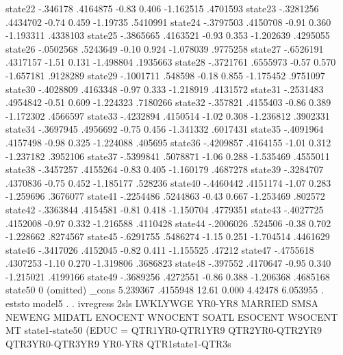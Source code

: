      state22 {\VBAR}   -.346178   .4164875    -0.83   0.406    -1.162515    .4701593
     state23 {\VBAR}  -.3281256   .4434702    -0.74   0.459     -1.19735    .5410991
     state24 {\VBAR}  -.3797503   .4150708    -0.91   0.360    -1.193311    .4338103
     state25 {\VBAR}  -.3865665   .4163521    -0.93   0.353    -1.202639    .4295055
     state26 {\VBAR}  -.0502568   .5243649    -0.10   0.924    -1.078039    .9775258
     state27 {\VBAR}  -.6526191   .4317157    -1.51   0.131    -1.498804    .1935663
     state28 {\VBAR}  -.3721761   .6555973    -0.57   0.570    -1.657181    .9128289
     state29 {\VBAR}  -.1001711    .548598    -0.18   0.855    -1.175452    .9751097
     state30 {\VBAR}  -.4028809   .4163348    -0.97   0.333    -1.218919    .4131572
     state31 {\VBAR}  -.2531483   .4954842    -0.51   0.609    -1.224323    .7180266
     state32 {\VBAR}   -.357821   .4155403    -0.86   0.389    -1.172302    .4566597
     state33 {\VBAR}  -.4232894   .4150514    -1.02   0.308    -1.236812    .3902331
     state34 {\VBAR}  -.3697945   .4956692    -0.75   0.456    -1.341332    .6017431
     state35 {\VBAR}  -.4091964   .4157498    -0.98   0.325    -1.224088     .405695
     state36 {\VBAR}  -.4209857   .4164155    -1.01   0.312    -1.237182    .3952106
     state37 {\VBAR}  -.5399841   .5078871    -1.06   0.288    -1.535469    .4555011
     state38 {\VBAR}  -.3457257   .4155264    -0.83   0.405    -1.160179    .4687278
     state39 {\VBAR}  -.3284707   .4370836    -0.75   0.452    -1.185177     .528236
     state40 {\VBAR}  -.4460442   .4151174    -1.07   0.283    -1.259696    .3676077
     state41 {\VBAR}  -.2254486   .5244863    -0.43   0.667    -1.253469     .802572
     state42 {\VBAR}  -.3363844   .4154581    -0.81   0.418    -1.150704    .4779351
     state43 {\VBAR}  -.4027725   .4152008    -0.97   0.332    -1.216588    .4110428
     state44 {\VBAR}  -.2006026    .524506    -0.38   0.702    -1.228662    .8274567
     state45 {\VBAR}  -.6291755   .5486274    -1.15   0.251    -1.704514    .4461629
     state46 {\VBAR}  -.3417026   .4152045    -0.82   0.411    -1.155525      .47212
     state47 {\VBAR}  -.4755618   .4307253    -1.10   0.270    -1.319806    .3686823
     state48 {\VBAR}   -.397552   .4170647    -0.95   0.340    -1.215021    .4199166
     state49 {\VBAR}  -.3689256   .4272551    -0.86   0.388    -1.206368    .4685168
     state50 {\VBAR}          0  (omitted)
       _cons {\VBAR}   5.239367   .4155948    12.61   0.000      4.42478    6.053955
{\smallskip}
. eststo model5
{\smallskip}
. 
. ivregress 2sls LWKLYWGE YR0-YR8 MARRIED SMSA NEWENG MIDATL ENOCENT WNOCENT SOATL ESOCENT WSOCENT MT  state1-state50 (EDUC = QTR1YR0-QTR1YR9 QTR2YR0-QTR2YR9 QTR3YR0-QTR3YR9 YR0-YR8 QTR1state1-QTR3s
